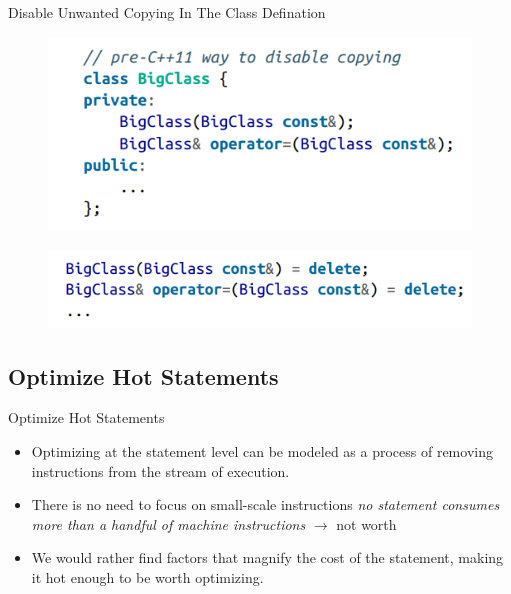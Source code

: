 \documentclass[aspectratio=169,xcolor=dvipsnames]{beamer}
\begin{document}
\begin{frame}{Disable Unwanted Copying In The Class Defination}
    \begin{figure}
        \centering
        \includegraphics[scale = 0.9]{unwated_copy_1.png}
        \label{fig:my_label}
    \end{figure}
    \begin{figure}
        \centering
        \includegraphics[scale = 0.9]{unwated_copy_2.png}
        \label{fig:my_label}
    \end{figure}
\end{frame}

\subsection{Optimize Hot Statements}
\begin{frame}{Optimize Hot Statements}
    \begin{itemize}
        \item Optimizing at the statement level can be modeled as a process of removing instructions from the stream of execution. 
        \item There is no need to focus on small-scale instructions \textit{no statement consumes more than a handful of machine instructions} $\rightarrow$ not worth
        \item We would rather find factors that magnify the cost of the statement, making it hot enough to be worth optimizing.
    \end{itemize}
\end{frame}
\end{document}
